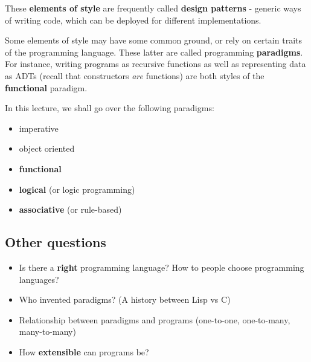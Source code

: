 \documentclass[a4paper, 12pt]{article}
\begin{document}
These \textbf{elements of style} are frequently called \textbf{design patterns} - generic ways of writing code, which can be deployed for different implementations. 

Some elements of style may have some common ground, or rely on certain traits of the programming language. These latter are called programming \textbf{paradigms}. For instance, writing programs as recursive functions as well as representing data as ADTs (recall that constructors \textit{are} functions) are both styles of the \textbf{functional} paradigm.

In this lecture, we shall go over the following paradigms:
  \begin{itemize}
  	\item  imperative
  	\item  object oriented
  	\item  \textbf{functional}
  	\item  \textbf{logical} (or logic programming)
  	\item  \textbf{associative} (or rule-based)
  \end{itemize}

\subsection{ Other questions }

  \begin{itemize}
  	\item  Is there a \textbf{right} programming language? How to people choose programming languages?
  	\item  Who invented paradigms? (A history between Lisp vs C)
  	\item  Relationship between paradigms and programs (one-to-one, one-to-many, many-to-many)
  	\item  How \textbf{extensible} can programs be?
  \end{itemize}
\end{document}
